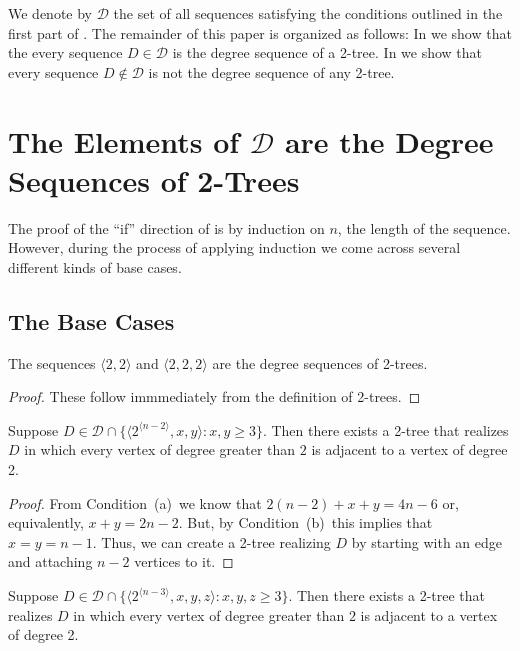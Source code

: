 \documentclass[lotsofwhite,charterfonts]{patmorin}
\newcommand{\rep}[1]{^{\langle#1\rangle}}
\newcommand{\degreesum}{Condition~(a)}
\newcommand{\maxdegree}{Condition~(b)}
\begin{document}
We denote by $\mathcal{D}$ the set of all sequences satisfying the
conditions outlined in the first part of .  The remainder
of this paper is organized as follows:  In  we show that
the every sequence $D\in \mathcal{D}$ is the degree sequence of a
2-tree.  In  we show that every sequence $D\not\in
\mathcal{D}$ is not the degree sequence of any 2-tree.

\section{The Elements of $\mathcal{D}$ are the Degree Sequences of
	2-Trees}

The proof of the ``if'' direction of  is by induction on
$n$, the length of the sequence.  However, during the process of
applying induction we come across several different kinds of base
cases.

\subsection{The Base Cases}

\begin{lem}
The sequences $\langle 2,2\rangle$ and $\langle 2,2,2\rangle$ are the
degree sequences of 2-trees.
\end{lem}

\begin{proof}
These follow immmediately from the definition of 2-trees.
\end{proof}


\begin{lem}
Suppose $D\in \mathcal{D}\cap \{\langle 2\rep{n-2},x,y\rangle:
x,y\ge 3\}$. 
Then there exists a 2-tree that realizes $D$ in which every vertex of
degree greater than $2$ is adjacent to a vertex of degree 2.
\end{lem}

\begin{proof}
From \degreesum\ we know that $2(n-2)+x+y=4n-6$ or, equivalently,
$x+y=2n-2$.  But, by \maxdegree\ this implies that $x=y=n-1$.  Thus,
we can create a 2-tree realizing $D$ by starting with an edge and
attaching $n-2$ vertices to it.
\end{proof}

\begin{lem}
Suppose $D\in \mathcal{D}\cap \{\langle 2\rep{n-3},x,y,z\rangle:
x,y,z\ge 3\}$. 
Then there exists a 2-tree that realizes $D$ in which every vertex of
degree greater than $2$ is adjacent to a vertex of degree 2.
\end{lem}
\end{document}
